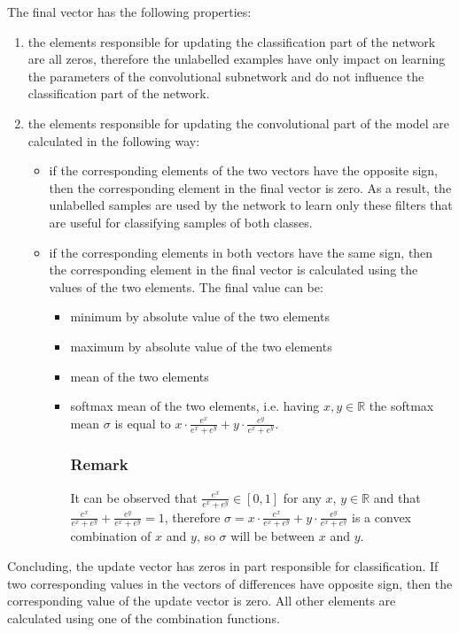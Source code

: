 \documentclass[a4paper,10pt]{report}
\begin{document}
           
      The final vector has the following properties:
      \begin{enumerate}
       \item the elements responsible for updating the classification part of the network are all zeros, therefore the unlabelled examples have only impact on learning the parameters of the convolutional subnetwork and do not influence the classification part of the network. 
       \item the elements responsible for updating the convolutional part of the model are calculated in the following way:
	\begin{itemize}
	 \item if the corresponding elements of the two vectors have the opposite sign, then the corresponding element in the final vector is zero. As a result, the unlabelled samples are used by the network to learn only these filters that are useful for classifying samples of both classes.
	  \item if the corresponding elements in both vectors have the same sign, then the corresponding element in the final vector is calculated using the values of the two elements. The final value can be:
	  \begin{itemize}
	    \item minimum by absolute value of the two elements
	    \item maximum by absolute value of the two elements
	    \item mean of the two elements
	    \item softmax mean of the two elements, i.e. having $x, y \in \mathbb{R}$ the softmax mean $\sigma$ is equal to $x \cdot \frac{e^x}{e^x + e^y} + y \cdot \frac{e^y}{e^x + e^y}$.
	    
	    \subsubsection{Remark}
	      It can be observed that $\frac{e^x}{e^x + e^y} \in [0, 1]$ for any $x$, $y \in \mathbb{R}$ and that $\frac{e^x}{e^x + e^y} + \frac{e^y}{e^x + e^y} = 1$, therefore $\sigma = x \cdot \frac{e^x}{e^x + e^y} + y \cdot \frac{e^y}{e^x + e^y}$ is a convex combination of $x$ and $y$, so $\sigma$ will be between $x$ and $y$. 
	  \end{itemize}
	\end{itemize}
      \end{enumerate}
            	
      Concluding, the update vector has zeros in part responsible for classification. If two corresponding values in the vectors of differences have opposite sign, then the corresponding value of the update vector is zero. All other elements are calculated using one of the combination functions. 
      
\end{document}
